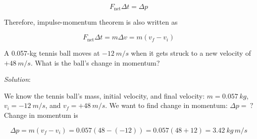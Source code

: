 \documentclass[dvipsnames]{article}
\begin{document}
\begin{equation*}
    F_\text{net} \Delta t = \Delta p
\end{equation*}

Therefore, impulse-momentum theorem is also written as

\begin{equation*}
    F_\text{net} \Delta t = m \Delta v = m(v_f - v_i)
\end{equation*}

\begin{example}\label{EvkSMv}
A 0.057-kg tennis ball moves at $-\SI{12}{m/s}$ when it gets struck to a new velocity of $+\SI{48}{m/s}$. What is the ball's change in momentum?

\begin{center}
%
%
\end{center}
\end{example}

\textit{Solution}: 

We know the tennis ball's mass, initial velocity, and final velocity: $m = \SI{0.057}{kg}$, $v_i = -\SI{12}{m/s}$, and $v_f = +\SI{48}{m/s}$. We want to find change in momentum: $\Delta p =\ ?$ Change in momentum is

\begin{equation*}
    \Delta p  = m \left(v_f - v_i\right) = 0.057 \left(48 - \left(-12\right) \right) = 0.057 \left(48 + 12 \right) = \SI{3.42}{kg\,m/s}
\end{equation*}
\end{document}
